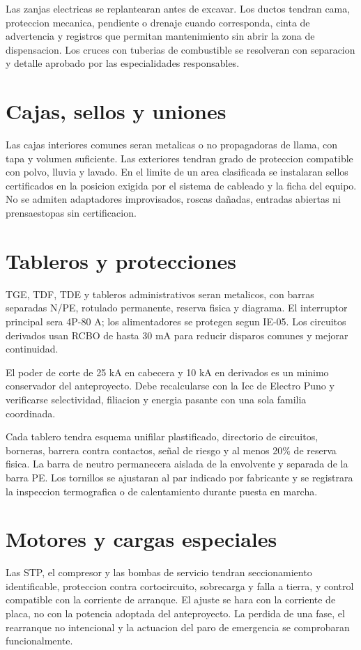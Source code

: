 Las zanjas electricas se replantearan antes de excavar. Los ductos tendran cama,
proteccion mecanica, pendiente o drenaje cuando corresponda, cinta de advertencia
y registros que permitan mantenimiento sin abrir la zona de dispensacion. Los
cruces con tuberias de combustible se resolveran con separacion y detalle aprobado
por las especialidades responsables.

\section{Cajas, sellos y uniones}
Las cajas interiores comunes seran metalicas o no propagadoras de llama, con tapa
y volumen suficiente. Las exteriores tendran grado de proteccion compatible con
polvo, lluvia y lavado. En el limite de un area clasificada se instalaran sellos
certificados en la posicion exigida por el sistema de cableado y la ficha del
equipo. No se admiten adaptadores improvisados, roscas dañadas, entradas abiertas
ni prensaestopas sin certificacion.

\section{Tableros y protecciones}
TGE, TDF, TDE y tableros administrativos seran metalicos, con barras separadas N/PE, rotulado permanente, reserva fisica y diagrama. El interruptor principal sera 4P-80 A; los alimentadores se protegen segun IE-05. Los circuitos derivados usan RCBO de hasta 30 mA para reducir disparos comunes y mejorar continuidad.

El poder de corte de 25 kA en cabecera y 10 kA en derivados es un minimo conservador del anteproyecto. Debe recalcularse con la Icc de Electro Puno y verificarse selectividad, filiacion y energia pasante con una sola familia coordinada.

Cada tablero tendra esquema unifilar plastificado, directorio de circuitos,
borneras, barrera contra contactos, señal de riesgo y al menos 20\% de reserva
fisica. La barra de neutro permanecera aislada de la envolvente y separada de la
barra PE. Los tornillos se ajustaran al par indicado por fabricante y se
registrara la inspeccion termografica o de calentamiento durante puesta en marcha.

\section{Motores y cargas especiales}
Las STP, el compresor y las bombas de servicio tendran seccionamiento identificable,
proteccion contra cortocircuito, sobrecarga y falla a tierra, y control compatible
con la corriente de arranque. El ajuste se hara con la corriente de placa, no con
la potencia adoptada del anteproyecto. La perdida de una fase, el rearranque no
intencional y la actuacion del paro de emergencia se comprobaran funcionalmente.

